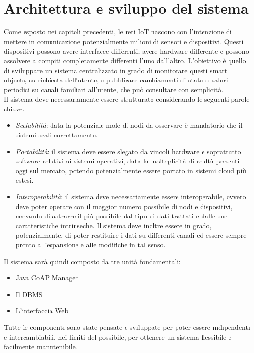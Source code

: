 \chapter{Architettura e sviluppo del sistema}
Come esposto nei capitoli precedenti, le reti IoT nascono con l'intenzione di mettere in comunicazione potenzialmente milioni di sensori e dispositivi. Questi dispositivi possono avere interfacce differenti, avere hardware differente e possono assolvere a compiti completamente differenti l'uno dall'altro. L'obiettivo è quello di sviluppare un sistema centralizzato in grado di monitorare questi smart objects, su richiesta dell'utente, e pubblicare cambiamenti di stato o valori periodici su canali familiari all'utente, che può consultare con semplicità.
\\Il sistema deve necessariamente essere strutturato considerando le seguenti parole chiave:
\begin{itemize}
\item \emph{Scalabilità}: data la potenziale mole di nodi da osservare è mandatorio che il sistemi scali correttamente.
\item \emph{Portabilità}: il sistema deve essere slegato da vincoli hardware e soprattutto software relativi ai sistemi operativi, data la molteplicità di realtà presenti oggi sul mercato, potendo potenzialmente essere portato in sistemi cloud più estesi.
\item \emph{Interoperabilità}: il sistema deve necessariamente essere interoperabile, ovvero deve poter operare con il maggior numero possibile di nodi e dispositivi, cercando di astrarre il più possibile dal tipo di dati trattati e dalle sue caratteristiche intrinseche. Il sistema deve inoltre essere in grado, potenzialmente, di poter restituire i dati su differenti canali ed essere sempre pronto all'espansione e alle modifiche in tal senso.
\end{itemize}
Il sistema sarà quindi composto da tre unità fondamentali:
\begin{itemize}
\item Java CoAP Manager
\item Il DBMS
\item L'interfaccia Web
\end{itemize}
Tutte le componenti sono state pensate e sviluppate per poter essere indipendenti e intercambiabili, nei limiti del possibile, per ottenere un sistema flessibile e facilmente manutenibile.
\vspace{1.0cm}
